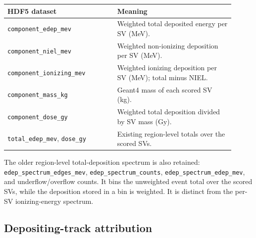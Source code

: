 \documentclass[11pt]{article}
\begin{document}
\begin{center}
\begin{tabular}{p{0.44\linewidth}p{0.47\linewidth}}
\toprule
HDF5 dataset & Meaning \\
\midrule
\texttt{component\_edep\_mev} & Weighted total deposited energy per SV (MeV). \\
\texttt{component\_niel\_mev} & Weighted non-ionizing deposition per SV (MeV). \\
\texttt{component\_ionizing\_mev} & Weighted ionizing deposition per SV (MeV); total minus NIEL. \\
\texttt{component\_mass\_kg} & Geant4 mass of each scored SV (kg). \\
\texttt{component\_dose\_gy} & Weighted total deposition divided by SV mass (Gy). \\
\texttt{total\_edep\_mev}, \texttt{dose\_gy} & Existing region-level totals over the scored SVs. \\
\bottomrule
\end{tabular}
\end{center}

The older region-level total-deposition spectrum is also retained:
\texttt{edep\_spectrum\_edges\_mev}, \texttt{edep\_spectrum\_counts},
\texttt{edep\_spectrum\_edep\_mev}, and underflow/overflow counts. It bins
the unweighted event total over the scored SVs, while the deposition stored
in a bin is weighted. It is distinct from the per-SV ionizing-energy spectrum.

\subsection{Depositing-track attribution}
\end{document}
